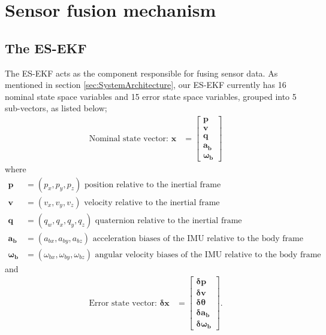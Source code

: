 \section{Sensor fusion mechanism}
\subsection{The \acrlong{ES-EKF}}
The \gls{ES-EKF} acts as the component responsible for fusing sensor data. As mentioned in section \ref{sec:SystemArchitecture}, our \gls{ES-EKF} currently has 16 nominal state space variables and 15 error state space variables, grouped into 5 sub-vectors, as listed below;
\begin{align}
    \text{Nominal state vector: }\textbf{x} &= \left[\begin{matrix}{}\textbf{p}\\\textbf{v}\\\textbf{q}\\\boldsymbol{a_b}\\\boldsymbol{\omega_b}\end{matrix}\right]
\end{align}
where
\begin{align}
    \textbf{p} &= (p_x, p_y, p_z) \text{ position relative to the inertial frame} \nonumber \\
    \textbf{v} &= (v_x, v_y, v_z) \text{ velocity relative to the inertial frame} \nonumber \\
    \textbf{q} &= (q_w, q_x, q_y, q_z) \text{ quaternion relative to the inertial frame} \nonumber \\
    \boldsymbol{a_b} &= (a_{bx}, a_{by}, a_{bz}) \text{ acceleration biases of the IMU relative to the body frame} \nonumber \\
    \boldsymbol{\omega_b} &= (\omega_{bx}, \omega_{by}, \omega_{bz}) \text{ angular velocity biases of the IMU relative to the body frame}
\end{align}
and
\begin{align}
	\text{Error state vector: }\boldsymbol{\delta}\textbf{x} &= \left[\begin{matrix}{}\boldsymbol{\delta}\textbf{p}\\\boldsymbol{\delta}\textbf{v}\\\boldsymbol{\delta}\boldsymbol{\theta}\\\boldsymbol{\delta}\boldsymbol{a_b}\\\boldsymbol{\delta}\boldsymbol{\omega_b}\end{matrix}\right].
\end{align}
